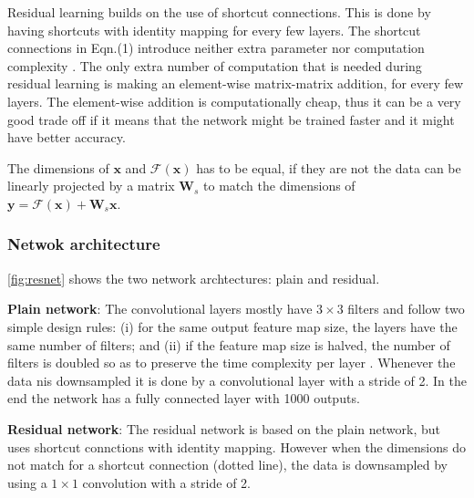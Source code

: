 Residual learning builds on the use of shortcut connections. 
This is done by having shortcuts with identity mapping for every few layers.
The shortcut connections in Eqn.(1) introduce neither extra parameter nor computation complexity \cite{resnet}.
The only extra number of computation that is needed during residual learning is making an element-wise matrix-matrix addition, for every few layers.
The element-wise addition is computationally cheap, thus it can be a very good trade off if it means that the network might be trained faster and it might have better accuracy.

The dimensions of $\bm{x}$ and $\mathcal{F}(\bm{x})$ has to be equal, if they are not the data can be linearly projected by a matrix $\bm{W}_s$ to match the dimensions of $\bm{y} = \mathcal{F}(\bm{x}) + \bm{W}_s\bm{x}$.

\subsubsection{Netwok architecture}%

\autoref{fig:resnet} shows the two network archtectures: plain and residual.

\textbf{Plain network}: The convolutional layers mostly have $3 \times 3$ filters and follow two simple design rules:
(i) for the same output
feature map size, the layers have the same number of filters; and
(ii) if the feature map size is halved, the number of filters is doubled so as to preserve the time complexity per layer
\cite{resnet}.
Whenever the data nis downsampled it is done by a convolutional layer with a stride of 2.
In the end the network has a fully connected layer with 1000 outputs.

\textbf{Residual network}: 
The residual network is based on the plain network, but uses shortcut connctions with identity mapping. However when the dimensions do not match for a shortcut connection (dotted line), the data is downsampled by using a $1 \times 1$ convolution with a stride of 2.

